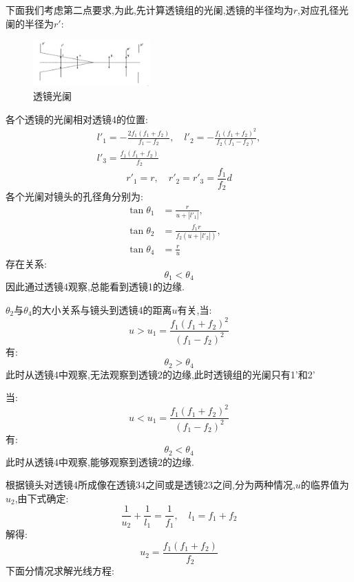 \documentclass[UTF8]{gapd}
\begin{document}
下面我们考虑第二点要求,为此,先计算透镜组的光阑,透镜的半径均为$r$,对应孔径光阑的半径为$r'$:
\begin{figure}[htbp]
  \centering
  \includegraphics[width=0.4\textwidth]{images/5.jpg}
  \caption{透镜光阑}
  \label{fig:5}
\end{figure}
各个透镜的光阑相对透镜4的位置:
\begin{multline}
    l'_1=-\frac{2f_1(f_1+f_2)}{f_1-f_2} ,\quad l'_2=-\frac{f_1(f_1+f_2)^2}{f_2(f_1-f_2)} ,\\
    l'_3=\frac{f_1(f_1+f_2)}{f_2} 
\end{multline}
\begin{equation}
  r'_1=r,\quad r'_2=r'_3=\frac{f_1}{f_2}d 
\end{equation}
各个光阑对镜头的孔径角分别为:
\begin{align}
  \tan\theta _1&=\frac{r}{u+|l'_1|} ,\quad \\
  \tan\theta _2&=\frac{f_1r}{f_2(u+|l'_2|)} ,\quad \\
  \tan\theta _4&=\frac{r}{u} 
\end{align}
存在关系:
\begin{equation}
  \theta_1<\theta_4
\end{equation}
因此通过透镜4观察,总能看到透镜1的边缘.

$\theta_2$与$\theta_4$的大小关系与镜头到透镜4的距离$u$有关,当:
\begin{equation}
  u>u_1=\frac{f_1(f_1+f_2)^2}{(f_1-f_2)^2} 
\end{equation}
有:
\begin{equation}
  \theta_2>\theta_4
\end{equation}
此时从透镜4中观察,无法观察到透镜2的边缘,此时透镜组的光阑只有1'和2'

当:
\begin{equation}
  u<u_1=\frac{f_1(f_1+f_2)^2}{(f_1-f_2)^2} 
\end{equation}
有:
\begin{equation}
  \theta_2<\theta_4
\end{equation}
此时从透镜4中观察,能够观察到透镜2的边缘.

根据镜头对透镜4所成像在透镜34之间或是透镜23之间,分为两种情况,$u$的临界值为$u_2$,由下式确定:
\begin{equation}
  \frac{1}{u_2}+\frac{1}{l_1}=\frac{1}{f_1},\quad l_1=f_1+f_2   
\end{equation}
解得:
\begin{equation}
  u_2=\frac{f_1(f_1+f_2)}{f_2} 
\end{equation}
下面分情况求解光线方程:
\end{document}
